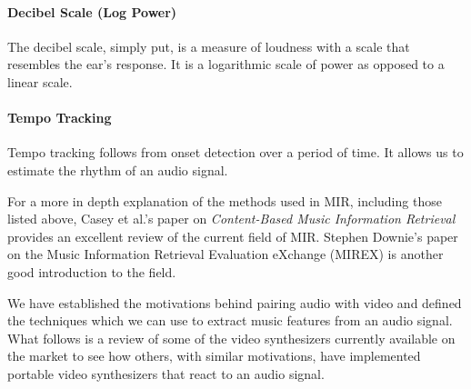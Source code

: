 \documentclass[../main_report2.tex]{subfiles}
\begin{document}
\paragraph{Decibel Scale (Log Power)}
The decibel scale, simply put, is a measure of loudness with a scale that resembles the ear's response. It is a logarithmic scale of power as opposed to a linear scale.

\paragraph{Tempo Tracking}
Tempo tracking follows from onset detection over a period of time. It allows us to estimate the rhythm of an audio signal.\\
\par

For a more in depth explanation of the methods used in MIR, including those listed above, Casey et al.'s paper on \textit{Content-Based Music Information Retrieval} \cite{Casey2008} provides an excellent review of the current field of MIR. Stephen Downie's paper \cite{Downie} on the Music Information Retrieval Evaluation eXchange (MIREX) is another good introduction to the field. \par

We have established the motivations behind pairing audio with video and defined the techniques which we can use to extract music features from an audio signal. What follows is a review of some of the video synthesizers currently available on the market to see how others, with similar motivations, have implemented portable video synthesizers that react to an audio signal.

\end{document}
